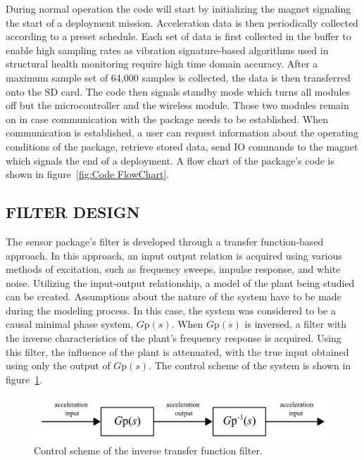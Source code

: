 \documentclass[]{spie}  %
\begin{document}
	During normal operation the code will start by initializing the magnet signaling the start of a deployment mission. Acceleration data is then periodically collected according to a preset schedule. Each set of data is first collected in the buffer to enable high sampling rates as vibration signature-based algorithms used in structural health monitoring require high time domain accuracy. After a maximum sample set of 64,000 samples is collected, the data is then transferred onto the SD card. The code then signals standby mode which turns all modules off but the microcontroller and the wireless module. Those two modules remain on in case communication with the package needs to be established. When communication is established, a user can request information about the operating conditions of the package, retrieve stored data, send IO commands to the magnet which signals the end of a deployment. A flow chart of the package’s code is shown in figure~\ref{fig:Code FlowChart}.
	
	\subsection{FILTER DESIGN}


	The sensor package's filter is developed through a transfer function-based approach. In this approach, an input output relation is acquired using various methods of excitation, such as frequency sweeps, impulse response, and white noise. Utilizing the input-output relationship, a model of the plant being studied can be created. Assumptions about the nature of the system have to be made during the modeling process. In this case, the system was considered to be a causal minimal phase system, $G$p$(s)$. When $G$p$(s)$ is inversed, a filter with the inverse characteristics of the plant’s frequency response is acquired. Using this filter, the influence of the plant is attenuated, with the true input obtained using only the output of $G$p$(s)$. The control scheme of the system is shown in figure~\ref{fig:Control_Scheme}.
	
	\begin{figure} [H]
		\centering
		\includegraphics[width=6 in]{figures/Control Scheme.png}
		\caption{Control scheme of the inverse transfer function filter.}
		\label{fig:Control_Scheme}
	\end{figure} 
\end{document}
